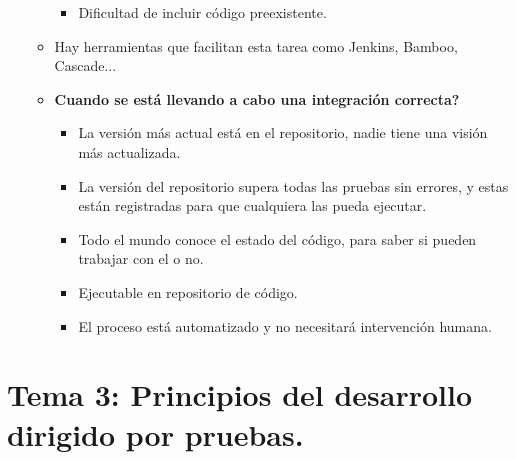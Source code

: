 \documentclass[12pt, twoside, openright]{report} %
\begin{document}
\begin{itemize}
\begin{itemize}
\begin{itemize}
    \item Dificultad de incluir código preexistente.
      
    \end{itemize}
  \item Hay herramientas que facilitan esta tarea como Jenkins, Bamboo,
    Cascade...
    
  \item \textbf{Cuando se está llevando a cabo una integración correcta?}
    

    \begin{itemize}
    \item La versión más actual está en el repositorio, nadie tiene una
      visión más actualizada.
      
    \item La versión del repositorio supera todas las pruebas sin errores, y
      estas están registradas para que cualquiera las pueda ejecutar.
      
    \item Todo el mundo conoce el estado del código, para saber si pueden
      trabajar con el o no.
      
    \item Ejecutable en repositorio de código.
      
    \item El proceso está automatizado y no necesitará intervención humana.
      
    \end{itemize}
  \end{itemize}
\end{itemize}
\chapter{Tema 3: Principios del desarrollo dirigido por pruebas.}
\end{document}

